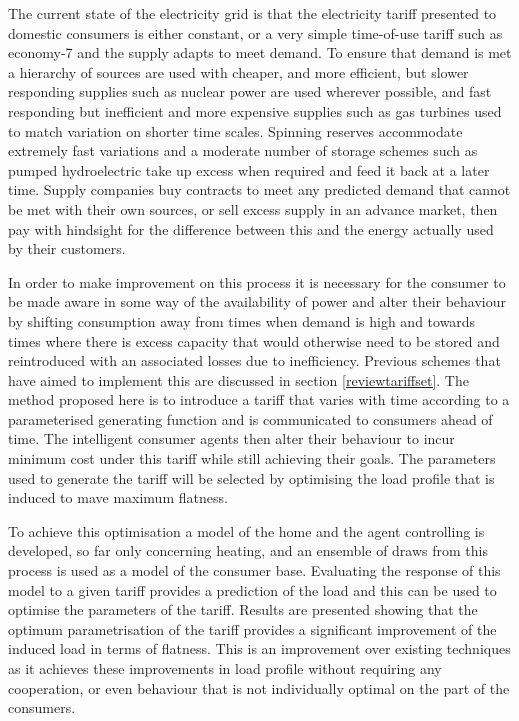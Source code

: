 \documentclass[a4paper, 10 pt, conference]{ieeeconf}  %
\begin{document}
The current state of the electricity grid is that the electricity tariff presented to domestic consumers is either constant, or a very simple time-of-use tariff such as economy-7 and the supply adapts to meet demand. To ensure that demand is met a hierarchy of sources are used with cheaper, and more efficient, but slower responding supplies such as nuclear power are used wherever possible, and fast responding but inefficient and more expensive supplies such as gas turbines used to match variation on shorter time scales. Spinning reserves accommodate extremely fast variations and a moderate number of storage schemes such as pumped hydroelectric take up excess when required and feed it back at a later time. Supply companies buy contracts to meet any predicted demand that cannot be met with their own sources, or sell excess supply in an advance market, then pay with hindsight for the difference between this and the energy actually used by their customers.

In order to make improvement on this process it is necessary for the consumer to be made aware in some way of the availability of power and alter their behaviour by shifting consumption away from times when demand is high and towards times where there is excess capacity that would otherwise need to be stored and reintroduced with an associated losses due to inefficiency. Previous schemes that have aimed to implement this are discussed in section \ref{reviewtariffset}. The method proposed here is to introduce a tariff that varies with time according to a parameterised generating function and is communicated to consumers ahead of time. The intelligent consumer agents then alter their behaviour to incur minimum cost under this tariff while still achieving their goals. The parameters used to generate the tariff will be selected by optimising the load profile that is induced to mave maximum flatness.

To achieve this optimisation a model of the home and the agent controlling is developed, so far only concerning heating, and an ensemble of draws from this process is used as a model of the consumer base. Evaluating the response of this model to a given tariff provides a prediction of the load and this can be used to optimise the parameters of the tariff. Results are presented showing that the optimum parametrisation of the tariff provides a significant improvement of the induced load in terms of flatness. This is an improvement over existing techniques as it achieves these improvements in load profile without requiring any cooperation, or even behaviour that is not individually optimal on the part of the consumers.
\end{document}
